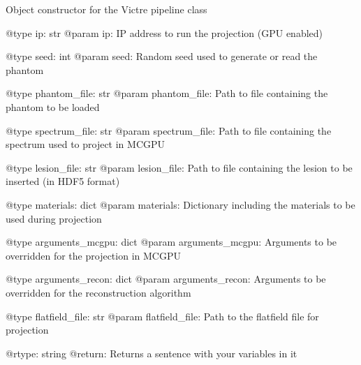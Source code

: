 \begin{DoxyVerb}Object constructor for the Victre pipeline class

@type ip: str
@param ip: IP address to run the projection (GPU enabled)

@type seed: int
@param seed: Random seed used to generate or read the phantom

@type phantom_file: str
@param phantom_file: Path to file containing the phantom to be loaded

@type spectrum_file: str
@param spectrum_file: Path to file containing the spectrum used to project in MCGPU

@type lesion_file: str
@param lesion_file: Path to file containing the lesion to be inserted (in HDF5 format)

@type materials: dict
@param materials: Dictionary including the materials to be used during projection

@type arguments_mcgpu: dict
@param arguments_mcgpu: Arguments to be overridden for the projection in MCGPU

@type arguments_recon: dict
@param arguments_recon: Arguments to be overridden for the reconstruction algorithm

@type flatfield_file: str
@param flatfield_file: Path to the flatfield file for projection

@rtype: string
@return: Returns a sentence with your variables in it
\end{DoxyVerb}
 

